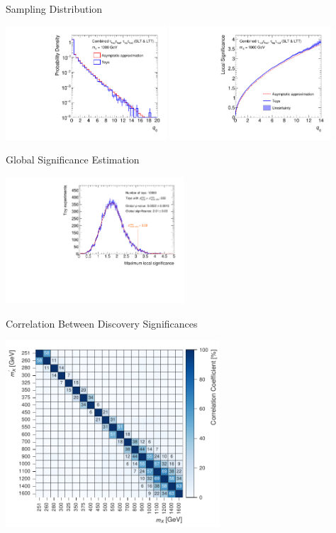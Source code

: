 \documentclass[11pt, xcolor={dvipsnames}, aspectratio=169, notes]{beamer}
\begin{document}
\begin{frame}{ Sampling Distribution}
  \centering

  \includegraphics[width=0.45\textwidth]{global_significance/local_sig_toys/q0_1000}\hfill%
  \includegraphics[width=0.45\textwidth]{global_significance/local_sig_toys/q0sig_1000}
\end{frame}


\begin{frame}{Global Significance Estimation}
  \centering

  \includegraphics[width=0.5\textwidth]{global_significance/zmax_toys}
\end{frame}


\begin{frame}{Correlation Between Discovery Significances}
  \centering

  \includegraphics[width=0.6\textwidth]{global_significance/sig_corr}

\end{frame}
\end{document}
